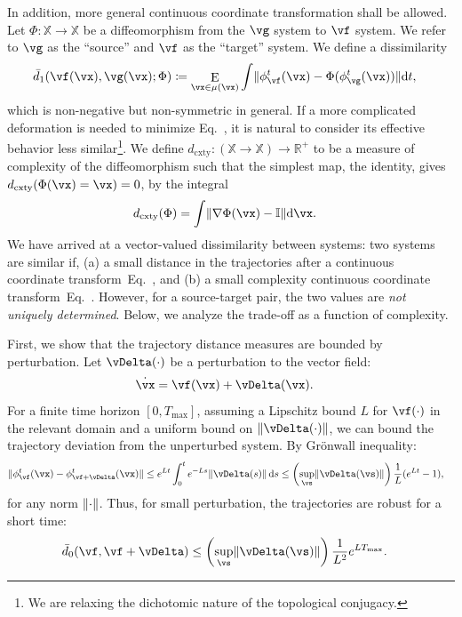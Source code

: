 \documentclass{article}
\theoremstyle{definition} \newtheorem{definition}{Definition}  \newtheorem{example}{Example}
\theoremstyle{remark} \newtheorem{remark}{Remark}
\renewcommand{\eqref}{Eq.~\originaleqref}
\newcounter{ct}
\DeclarePairedDelimiter{\norm}{\lVert}{\rVert}
\DeclareMathOperator*{\E}{\rm E} %
\newcommand{\dm}[1]{\ensuremath{\mathrm{d}{#1}}} %
\newcommand{\field}[1]{\ensuremath{\mathbb{#1}}}
\newcommand{\reals}{\field{R}}
\newcommand{\identity}{\ensuremath{\mathbb{I}}}
\newcommand{\posReals}{\reals^{+}}
\newcommand{\inputSpace}{\mathbb{X}}
\newcommand{\dcomplexity}{\ensuremath{d_\text{cxty}}}
\newcommand{\initDist}{\mu} %
\newcommand{\homeo}{\Phi} %
\begin{document}
In addition, more general continuous coordinate transformation shall be allowed.
Let $\homeo: \inputSpace \to \inputSpace$ be a diffeomorphism from the $\vg$ system to $\vf$ system.
We refer to $\vg$ as the ``source'' and $\vf$ as the ``target'' system.
We define a dissimilarity
\begin{align}\label{eq:ed1}
    \bar{d}_1(\vf(\vx), \vg(\vx); \homeo)
	&\coloneq 
	    \E_{\vx \in \initDist(\vx)}
		\int
		    \norm{\phi_{\vf}^t(\vx) - \homeo(\phi_{\vg}^t(\vx))}
		\dm{t},
\end{align}
which is non-negative but non-symmetric in general.
If a more complicated deformation is needed to minimize \eqref{eq:ed1}, it is natural to consider its effective behavior less similar\footnote{
We are relaxing the dichotomic nature of the topological conjugacy.
}.
We define  $\dcomplexity: (\inputSpace \to \inputSpace) \to \posReals$ to be a measure of complexity of the diffeomorphism such that the simplest map, the identity, gives $\dcomplexity(\homeo(\vx) = \vx) = 0$, by the integral
\begin{align}\label{eq:dcomplexity}
    \dcomplexity(\homeo) &=
    \int
	 \norm{\nabla\homeo(\vx) - \identity} %
    \dm{\vx}.
\end{align}
%
We have arrived at a vector-valued dissimilarity between systems:
two systems are similar if,
(a) a small distance in the trajectories after a continuous coordinate transform~\eqref{eq:ed1},
and (b) a small complexity continuous coordinate transform~\eqref{eq:dcomplexity}.
However, for a source-target pair, the two values are \emph{not uniquely determined}.
Below, we analyze the trade-off as a function of complexity.

First, we show that the trajectory distance measures are bounded by perturbation.
Let $\vDelta(\cdot)$ be a perturbation to the vector field:
\begin{align}
    \dot{\vx} &= \vf(\vx) + \vDelta(\vx).
\end{align}
For a finite time horizon $[0, T_\text{max}]$, assuming a Lipschitz bound $L$ for $\vf(\cdot)$ in the relevant domain and a uniform bound on $\norm{\vDelta(\cdot)}$, we can bound the trajectory deviation from the unperturbed system.
By Gr\"onwall inequality\cite{Howard2025}:
\begin{align}\label{eq:gronwall}
    \norm{
	\phi^t_\vf(\vx)
	-
	\phi^t_{\vf + \vDelta}(\vx)
    }
    &\leq
	e^{Lt} \int_0^{t} e^{-Ls} \norm{\vDelta(s)} \,\mathrm{d}s
    \leq
	\left(\sup_\vs \norm{\vDelta(\vs)}\right) \frac{1}{L} (e^{Lt} - 1),
\end{align}
for any norm $\norm{\cdot}$.
Thus, for small perturbation, the trajectories are robust for a short time:
\begin{align}\label{eq:d0bound}
    \bar{d}_0(\vf, \vf + \vDelta)
    &\leq
    \left(\sup_\vs \norm{\vDelta(\vs)}\right) \frac{1}{L^2} e^{LT_{\text{max}}}.
\end{align}
\end{document}
